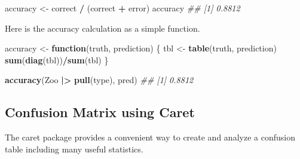 \documentclass[
  notitlepage]{book}
\newenvironment{Shaded}{\begin{snugshade}}{\end{snugshade}}
\newcommand{\CommentTok}[1]{\textcolor[rgb]{0.56,0.35,0.01}{\textit{#1}}}
\newcommand{\ControlFlowTok}[1]{\textcolor[rgb]{0.13,0.29,0.53}{\textbf{#1}}}
\newcommand{\ErrorTok}[1]{\textcolor[rgb]{0.64,0.00,0.00}{\textbf{#1}}}
\newcommand{\KeywordTok}[1]{\textcolor[rgb]{0.13,0.29,0.53}{\textbf{#1}}}
\newcommand{\NormalTok}[1]{#1}
\newcommand{\OperatorTok}[1]{\textcolor[rgb]{0.81,0.36,0.00}{\textbf{#1}}}
\newcommand{\StringTok}[1]{\textcolor[rgb]{0.31,0.60,0.02}{#1}}
\begin{document}
\begin{Shaded}
\begin{Highlighting}[]
\NormalTok{accuracy \textless{}{-}}\StringTok{ }\NormalTok{correct }\OperatorTok{/}\StringTok{ }\NormalTok{(correct }\OperatorTok{+}\StringTok{ }\NormalTok{error)}
\NormalTok{accuracy}
\CommentTok{\#\# [1] 0.8812}
\end{Highlighting}
\end{Shaded}

Here is the accuracy calculation as a simple function.

\begin{Shaded}
\begin{Highlighting}[]
\NormalTok{accuracy \textless{}{-}}\StringTok{ }\ControlFlowTok{function}\NormalTok{(truth, prediction) \{}
\NormalTok{    tbl \textless{}{-}}\StringTok{ }\KeywordTok{table}\NormalTok{(truth, prediction)}
    \KeywordTok{sum}\NormalTok{(}\KeywordTok{diag}\NormalTok{(tbl))}\OperatorTok{/}\KeywordTok{sum}\NormalTok{(tbl)}
\NormalTok{\}}

\KeywordTok{accuracy}\NormalTok{(Zoo }\OperatorTok{|}\ErrorTok{\textgreater{}}\StringTok{ }\KeywordTok{pull}\NormalTok{(type), pred)}
\CommentTok{\#\# [1] 0.8812}
\end{Highlighting}
\end{Shaded}

\hypertarget{confusion-matrix-using-caret}{%
\subsection{Confusion Matrix using Caret}\label{confusion-matrix-using-caret}}

The caret package provides a convenient way to create and
analyze a confusion table including many useful statistics.
\end{document}
